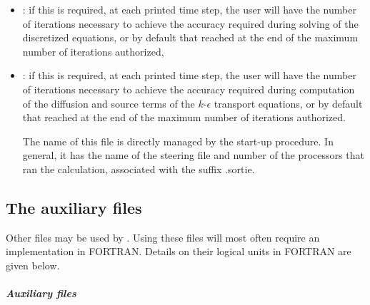 \begin{itemize}
\item {}:
if this is required, at each printed time step, the user will have the number
of iterations necessary to achieve the accuracy required during
solving of the discretized equations, or by default that reached at the end
of the maximum number of iterations authorized,

\item {}:
if this is required, at each printed time step, the user will have
the number of iterations necessary to achieve the accuracy required
during computation of the diffusion and source terms of the $k$-$\epsilon$
transport equations,
or by default that reached at the end of the maximum number of iterations
authorized.

The name of this file is directly managed by the  start-up procedure.
In general, it has the name of the steering file and number of the processors
that ran the calculation, associated with the suffix .sortie.

\end{itemize}

\subsection{The auxiliary files}

Other files may be used by .
Using these files will most often require an implementation in FORTRAN.
Details on their logical units in FORTRAN are given below.

\subparagraph{Auxiliary files}

